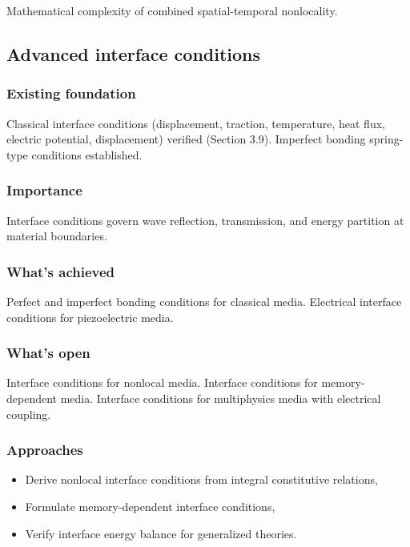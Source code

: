 Mathematical complexity of combined spatial-temporal nonlocality.

\subsection{Advanced interface conditions}
\label{sec:16.5}

\subsubsection{Existing foundation}

Classical interface conditions (displacement, traction, temperature, heat flux, electric potential, displacement) verified (Section 3.9). Imperfect bonding spring-type conditions established.

\subsubsection{Importance}

Interface conditions govern wave reflection, transmission, and energy partition at material boundaries.

\subsubsection{What's achieved}

Perfect and imperfect bonding conditions for classical media. Electrical interface conditions for piezoelectric media.

\subsubsection{What's open}

Interface conditions for nonlocal media. Interface conditions for memory-dependent media. Interface conditions for multiphysics media with electrical coupling.

\subsubsection{Approaches}

\begin{itemize}
\item Derive nonlocal interface conditions from integral constitutive relations,
\item Formulate memory-dependent interface conditions,
\item Verify interface energy balance for generalized theories.
\end{itemize}

